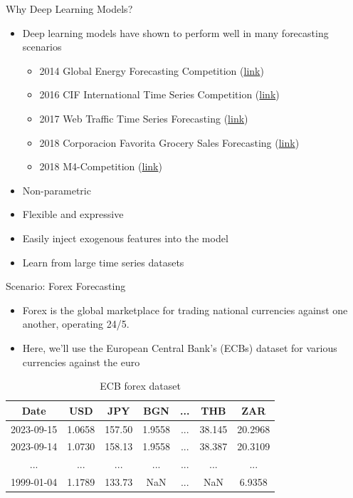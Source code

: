 \documentclass[aspectratio=169, 12pt]{beamer}
\begin{document}
\begin{frame}{Why Deep Learning Models?}
    \begin{itemize}
    \item Deep learning models have shown to perform well in many forecasting scenarios
        \begin{itemize}
            \item 2014 Global Energy Forecasting Competition (\href{https://www.crowdanalytix.com/contests/global-energy-forecasting-competition-2014-probabilistic-electricity-price-forecasting}{link})
            \item 2016 CIF International Time Series Competition (\href{https://irafm.osu.cz/cif/main.php}{link})
            \item 2017 Web Traffic Time Series Forecasting (\href{https://www.kaggle.com/c/web-traffic-time-series-forecasting#timeline}{link})
            \item 2018 Corporacion Favorita Grocery Sales Forecasting (\href{https://www.kaggle.com/c/favorita-grocery-sales-forecasting}{link})
            \item 2018 M4-Competition (\href{https://forecasters.org/blog/2017/12/21/m4-competition-1-1-2018/}{link})
        \end{itemize}
    
    \item Non-parametric
    \item Flexible and expressive
    \item Easily inject exogenous features into the model
    \item Learn from large time series datasets
\end{itemize}

\end{frame}

\begin{frame}{Scenario: Forex Forecasting}
    \begin{itemize}
        \item Forex is the global marketplace for trading national currencies against one another, operating 24/5.
        \item  Here, we'll use the European Central Bank's (ECBs) dataset for various currencies against the euro
    \end{itemize}
\begin{table}[h]
\centering
\caption{ECB forex dataset}\label{tab:data}
\begin{tabular}{ccccccc}
\toprule
\textbf{Date} & \textbf{USD} & \textbf{JPY} & \textbf{BGN} & \textbf{...} & \textbf{THB} & \textbf{ZAR} \\
\midrule
2023-09-15 & 1.0658 & 157.50 & 1.9558 & ... & 38.145 & 20.2968 \\
2023-09-14 & 1.0730 & 158.13 & 1.9558 & ... & 38.387 & 20.3109 \\
... & ... & ... & ... & ... & ... & ... \\
1999-01-04 & 1.1789 & 133.73 & NaN & ... & NaN & 6.9358 \\
\bottomrule
\end{tabular}
\end{table}
\end{frame}
\end{document}
